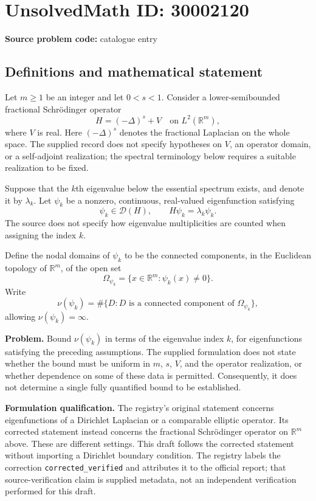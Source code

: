 \documentclass[11pt]{article}
\newcommand{\R}{\mathbb{R}}
\begin{document}
\section*{UnsolvedMath ID: 30002120}
\textbf{Source problem code:} catalogue entry
\subsection{Definitions and mathematical statement}
Let \(m\geq 1\) be an integer and let \(0<s<1\). Consider a lower-semibounded fractional Schrödinger operator
\[
H=(-\Delta)^s+V\quad\text{on }L^2(\R^m),
\]
where \(V\) is real. Here \((-\Delta)^s\) denotes the fractional Laplacian on the whole space. The supplied record does not specify hypotheses on \(V\), an operator domain, or a self-adjoint realization; the spectral terminology below requires a suitable realization to be fixed.

Suppose that the \(k\)th eigenvalue below the essential spectrum exists, and denote it by \(\lambda_k\). Let \(\psi_k\) be a nonzero, continuous, real-valued eigenfunction satisfying
\[
\psi_k\in\mathcal D(H),\qquad H\psi_k=\lambda_k\psi_k.
\]
The source does not specify how eigenvalue multiplicities are counted when assigning the index \(k\).

Define the nodal domains of \(\psi_k\) to be the connected components, in the Euclidean topology of \(\R^m\), of the open set
\[
\Omega_{\psi_k}=\{x\in\R^m:\psi_k(x)\neq 0\}.
\]
Write
\[
\nu(\psi_k)=\#\{D:D\text{ is a connected component of }\Omega_{\psi_k}\},
\]
allowing \(\nu(\psi_k)=\infty\).

\textbf{Problem.} Bound \(\nu(\psi_k)\) in terms of the eigenvalue index \(k\), for eigenfunctions satisfying the preceding assumptions. The supplied formulation does not state whether the bound must be uniform in \(m\), \(s\), \(V\), and the operator realization, or whether dependence on some of these data is permitted. Consequently, it does not determine a single fully quantified bound to be established.

\textbf{Formulation qualification.} The registry's original statement concerns eigenfunctions of a Dirichlet Laplacian or a comparable elliptic operator. Its corrected statement instead concerns the fractional Schrödinger operator on \(\R^m\) above. These are different settings. This draft follows the corrected statement without importing a Dirichlet boundary condition. The registry labels the correction \texttt{corrected\_verified} and attributes it to the official report; that source-verification claim is supplied metadata, not an independent verification performed for this draft.
\end{document}

